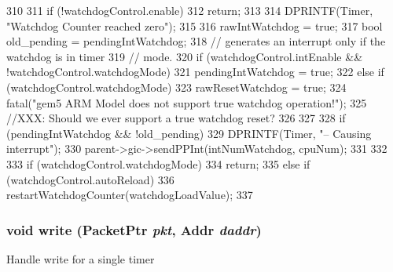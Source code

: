 \begin{DoxyCode}
310 {
311     if (!watchdogControl.enable)
312         return;
313 
314     DPRINTF(Timer, "Watchdog Counter reached zero\n");
315 
316     rawIntWatchdog = true;
317     bool old_pending = pendingIntWatchdog;
318     // generates an interrupt only if the watchdog is in timer
319     // mode.
320     if (watchdogControl.intEnable && !watchdogControl.watchdogMode)
321         pendingIntWatchdog = true;
322     else if (watchdogControl.watchdogMode) {
323         rawResetWatchdog = true;
324         fatal("gem5 ARM Model does not support true watchdog operation!\n");
325         //XXX: Should we ever support a true watchdog reset?
326     }
327 
328     if (pendingIntWatchdog && !old_pending) {
329         DPRINTF(Timer, "-- Causing interrupt\n");
330         parent->gic->sendPPInt(intNumWatchdog, cpuNum);
331     }
332 
333     if (watchdogControl.watchdogMode)
334         return;
335     else if (watchdogControl.autoReload)
336         restartWatchdogCounter(watchdogLoadValue);
337 }
\end{DoxyCode}
\hypertarget{classCpuLocalTimer_1_1Timer_a26d6a1d80de386690a8ad73932f83d96}{
\subsubsection[{write}]{\setlength{\rightskip}{0pt plus 5cm}void write ({\bf PacketPtr} {\em pkt}, \/  {\bf Addr} {\em daddr})}}
\label{classCpuLocalTimer_1_1Timer_a26d6a1d80de386690a8ad73932f83d96}
Handle write for a single timer 


